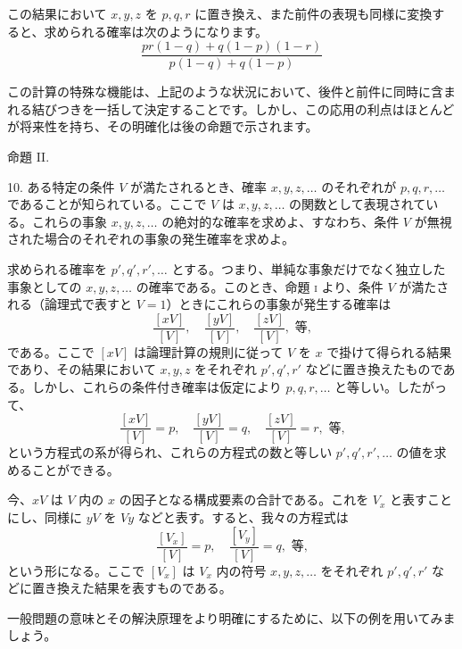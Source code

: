\documentclass[a4paper,11pt,openany]{ltjsbook}
\begin{document}
この結果において $x, y, z$ を $p, q, r$ に置き換え、また前件の表現も同様に変換すると、求められる確率は次のようになります。
\[
\frac{pr(1-q) + q(1-p)(1-r)}{p(1-q) + q(1-p)}
\]

この計算の特殊な機能は、上記のような状況において、後件と前件に同時に含まれる結びつきを一括して決定することです。しかし、この応用の利点はほとんどが将来性を持ち、その明確化は後の命題で示されます。

\begin{center}\textsc{命題 II.}\end{center}

10. ある特定の条件 \( V \) が満たされるとき、確率 \( x, y, z, \dotsc \) のそれぞれが \( p, q, r, \dotsc \) であることが知られている。ここで \( V \) は \( x, y, z, \dotsc \) の関数として表現されている。これらの事象 \( x, y, z, \dotsc \) の絶対的な確率を求めよ、すなわち、条件 \( V \) が無視された場合のそれぞれの事象の発生確率を求めよ。

求められる確率を \( p', q', r', \dotsc \) とする。つまり、単純な事象だけでなく独立した事象としての \( x, y, z, \dotsc \) の確率である。このとき、命題 \textsc{i} より、条件 \( V \) が満たされる（論理式で表すと \( V = 1 \)）ときにこれらの事象が発生する確率は
\[
  \frac{\left[ xV \right]}{\left[ V \right]},\quad
  \frac{\left[ yV \right]}{\left[ V \right]},\quad
  \frac{\left[ zV \right]}{\left[ V \right]},\text{ 等,}
\]
である。ここで \( \left[ xV \right] \) は論理計算の規則に従って \( V \) を \( x \) で掛けて得られる結果であり、その結果において \( x, y, z \) をそれぞれ \( p', q', r' \) などに置き換えたものである。しかし、これらの条件付き確率は仮定により \( p, q, r, \dotsc \) と等しい。したがって、
\[
  \frac{\left[ xV \right]}{\left[ V \right]} = p,\quad
  \frac{\left[ yV \right]}{\left[ V \right]} = q,\quad
  \frac{\left[ zV \right]}{\left[ V \right]} = r, \text{ 等,}
\]
という方程式の系が得られ、これらの方程式の数と等しい \( p', q', r', \dotsc \) の値を求めることができる。

今、\( xV \) は \( V \) 内の \( x \) の因子となる構成要素の合計である。これを \( V_x \) と表すことにし、同様に \( yV \) を \( Vy \) などと表す。すると、我々の方程式は
\[
  \frac{\left[ V_x \right]}{\left[ V \right]} = p,\quad
  \frac{\left[ V_y \right]}{\left[ V \right]} = q, \text{ 等,}
\]
という形になる。ここで \( \left[ V_x \right] \) は \( V_x \) 内の符号 \( x, y, z, \dotsc \) をそれぞれ \( p', q', r' \) などに置き換えた結果を表すものである。

一般問題の意味とその解決原理をより明確にするために、以下の例を用いてみましょう。
\end{document}
